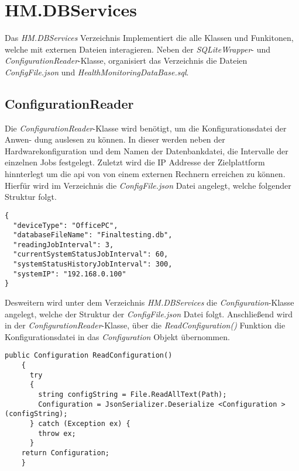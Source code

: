 \newpage
\section{HM.DBServices}\label{sec:HMDBServices}
Das \textit{HM.DBServices} Verzeichnis Implementiert die alle Klassen und Funkitonen, welche mit externen Dateien interagieren. Neben der \textit{SQLiteWrapper}- und \textit{ConfigurationReader}-Klasse, organisiert das Verzeichnis die Dateien \textit{ConfigFile.json} und \textit{HealthMonitoringDataBase.sql}.

\subsection*{ConfigurationReader}
Die \textit{ConfigurationReader}-Klasse wird benötigt, um die Konfigurationsdatei der Anwen- dung auslesen zu können. In dieser werden neben der Hardwarekonfiguration und dem Namen der Datenbankdatei, die Intervalle der einzelnen Jobs festgelegt. Zuletzt wird die IP Addresse der Zielplattform hinnterlegt um die \ac{api} von von einem externen Rechnern erreichen zu können.
Hierfür wird im Verzeichnis die \textit{ConfigFile.json} Datei angelegt, welche folgender Struktur folgt.
\begin{lstlisting}[caption={Konfigurationsdatei der Hardware-Health-Monitor Anwendung}, label={lst:ConfigFileStrukture}]
{
  "deviceType": "OfficePC",
  "databaseFileName": "Finaltesting.db",
  "readingJobInterval": 3,
  "currentSystemStatusJobInterval": 60,
  "systemStatusHistoryJobInterval": 300,
  "systemIP": "192.168.0.100"
}
\end{lstlisting}
Desweitern wird unter dem Verzeichnis \textit{HM.DBServices} die \textit{Configuration}-Klasse angelegt, welche der Struktur der \textit{ConfigFile.json} Datei folgt. Anschließend wird in der \textit{ConfigurationReader}-Klasse, über die \textit{ReadConfiguration()} Funktion die Konfigurationsdatei in das \textit{Configuration} Objekt übernommen.
\begin{lstlisting}[caption={\textit{ReadConfiguration()} Funktion der \textit{ConfigurationReader}-Klasse}, label={lst:ReadConfiguration}]
    public Configuration ReadConfiguration()
    {
      try
      {
        string configString = File.ReadAllText(Path);    
        Configuration = JsonSerializer.Deserialize <Configuration >(configString);
      } catch (Exception ex) {
        throw ex; 
      }
    return Configuration;
    }\end{lstlisting}

